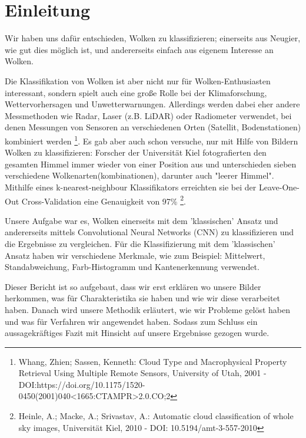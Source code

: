 \documentclass[a4,german]{article}
\begin{document}
\section{Einleitung}


Wir haben uns dafür entschieden, Wolken zu klassifizieren; einerseits aus Neugier, wie gut dies möglich ist, und andererseits einfach aus eigenem Interesse an Wolken.

 Die Klassifikation von Wolken ist aber nicht nur für Wolken-Enthusiasten interessant, sondern spielt auch eine große Rolle bei der Klimaforschung, Wettervorhersagen und Unwetterwarnungen. Allerdings werden dabei eher andere Messmethoden wie Radar, Laser (z.B. LiDAR) oder Radiometer verwendet, bei denen Messungen von Sensoren an verschiedenen Orten (Satellit, Bodenstationen) kombiniert werden \footnote{Whang, Zhien; Sassen, Kenneth: Cloud Type and Macrophysical Property Retrieval Using Multiple Remote Sensors, University of Utah, 2001 - DOI:https://doi.org/10.1175/1520-0450(2001)040<1665:CTAMPR>2.0.CO;2}. Es gab aber auch schon versuche, nur mit Hilfe von Bildern Wolken zu klassifizieren: Forscher der Universität Kiel fotografierten den gesamten Himmel immer wieder von einer Position aus und unterschieden sieben verschiedene Wolkenarten(kombinationen), darunter auch "leerer Himmel". Mithilfe eines k-nearest-neighbour Klassifikators erreichten sie bei der Leave-One-Out Cross-Validation eine Genauigkeit von 97\% \footnote{Heinle, A.; Macke, A.; Srivastav, A.: Automatic cloud classification of whole sky images, Universität Kiel, 2010 - DOI: 10.5194/amt-3-557-2010}.

Unsere Aufgabe war es, Wolken einerseits mit dem 'klassischen' Ansatz und andererseits mittels Convolutional Neural Networks (CNN) zu klassifizieren und die Ergebnisse zu vergleichen. 
Für die Klassifizierung mit dem 'klassischen' Ansatz haben wir verschiedene Merkmale, wie zum Beispiel: Mittelwert, Standabweichung, Farb-Histogramm und Kantenerkennung verwendet.
 
 Dieser Bericht ist so aufgebaut, dass wir erst erklären wo unsere Bilder herkommen, was für Charakteristika sie haben und wie wir diese verarbeitet haben. Danach wird unsere Methodik erläutert, wie wir Probleme gelöst haben und was für Verfahren wir angewendet haben. Sodass zum Schluss ein aussagekräftiges Fazit mit Hinsicht auf unsere Ergebnisse gezogen wurde.
 
\end{document}
